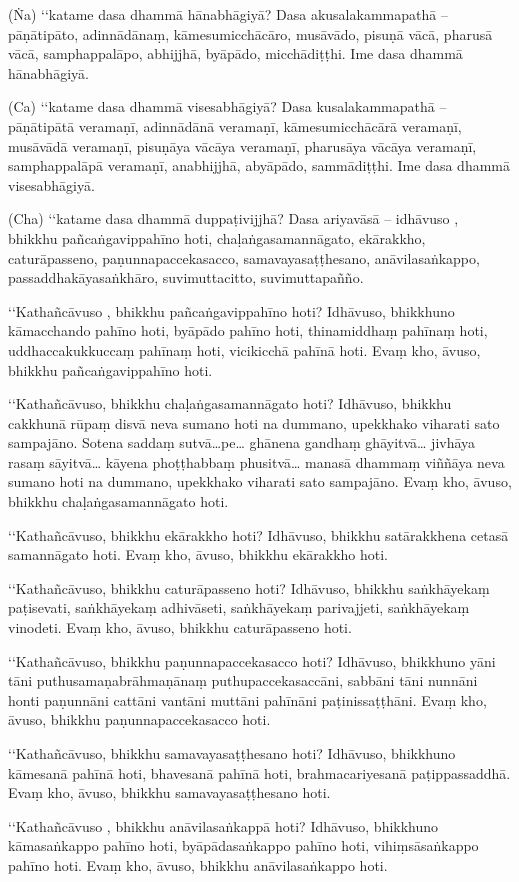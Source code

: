 (Ṅa) ‘‘katame dasa dhammā hānabhāgiyā? Dasa akusalakammapathā – pāṇātipāto, adinnādānaṃ, kāmesumicchācāro, musāvādo, pisuṇā vācā, pharusā vācā, samphappalāpo, abhijjhā, byāpādo, micchādiṭṭhi. Ime dasa dhammā hānabhāgiyā.

(Ca) ‘‘katame dasa dhammā visesabhāgiyā? Dasa kusalakammapathā – pāṇātipātā veramaṇī, adinnādānā veramaṇī, kāmesumicchācārā veramaṇī, musāvādā veramaṇī, pisuṇāya vācāya veramaṇī, pharusāya vācāya veramaṇī, samphappalāpā veramaṇī, anabhijjhā, abyāpādo, sammādiṭṭhi. Ime dasa dhammā visesabhāgiyā.

(Cha) ‘‘katame dasa dhammā duppaṭivijjhā? Dasa ariyavāsā – idhāvuso , bhikkhu pañcaṅgavippahīno hoti, chaḷaṅgasamannāgato, ekārakkho, caturāpasseno, paṇunnapaccekasacco, samavayasaṭṭhesano, anāvilasaṅkappo, passaddhakāyasaṅkhāro, suvimuttacitto, suvimuttapañño.

‘‘Kathañcāvuso , bhikkhu pañcaṅgavippahīno hoti? Idhāvuso, bhikkhuno kāmacchando pahīno hoti, byāpādo pahīno hoti, thinamiddhaṃ pahīnaṃ hoti, uddhaccakukkuccaṃ pahīnaṃ hoti, vicikicchā pahīnā hoti. Evaṃ kho, āvuso, bhikkhu pañcaṅgavippahīno hoti.

‘‘Kathañcāvuso, bhikkhu chaḷaṅgasamannāgato hoti? Idhāvuso, bhikkhu cakkhunā rūpaṃ disvā neva sumano hoti na dummano, upekkhako viharati sato sampajāno. Sotena saddaṃ sutvā…pe… ghānena gandhaṃ ghāyitvā… jivhāya rasaṃ sāyitvā… kāyena phoṭṭhabbaṃ phusitvā… manasā dhammaṃ viññāya neva sumano hoti na dummano, upekkhako viharati sato sampajāno. Evaṃ kho, āvuso, bhikkhu chaḷaṅgasamannāgato hoti.

‘‘Kathañcāvuso, bhikkhu ekārakkho hoti? Idhāvuso, bhikkhu satārakkhena cetasā samannāgato hoti. Evaṃ kho, āvuso, bhikkhu ekārakkho hoti.

‘‘Kathañcāvuso, bhikkhu caturāpasseno hoti? Idhāvuso, bhikkhu saṅkhāyekaṃ paṭisevati, saṅkhāyekaṃ adhivāseti, saṅkhāyekaṃ parivajjeti, saṅkhāyekaṃ vinodeti. Evaṃ kho, āvuso, bhikkhu caturāpasseno hoti.

‘‘Kathañcāvuso, bhikkhu paṇunnapaccekasacco hoti? Idhāvuso, bhikkhuno yāni tāni puthusamaṇabrāhmaṇānaṃ puthupaccekasaccāni, sabbāni tāni nunnāni honti paṇunnāni cattāni vantāni muttāni pahīnāni paṭinissaṭṭhāni. Evaṃ kho, āvuso, bhikkhu paṇunnapaccekasacco hoti.

‘‘Kathañcāvuso, bhikkhu samavayasaṭṭhesano hoti? Idhāvuso, bhikkhuno kāmesanā pahīnā hoti, bhavesanā pahīnā hoti, brahmacariyesanā paṭippassaddhā. Evaṃ kho, āvuso, bhikkhu samavayasaṭṭhesano hoti.

‘‘Kathañcāvuso , bhikkhu anāvilasaṅkappā hoti? Idhāvuso, bhikkhuno kāmasaṅkappo pahīno hoti, byāpādasaṅkappo pahīno hoti, vihiṃsāsaṅkappo pahīno hoti. Evaṃ kho, āvuso, bhikkhu anāvilasaṅkappo hoti.

